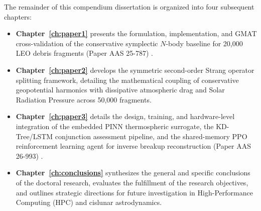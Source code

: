 The remainder of this compendium dissertation is organized into four subsequent chapters:
\begin{itemize}
    \item \textbf{Chapter~\ref{ch:paper1}} presents the formulation, implementation, and GMAT cross-validation of the conservative symplectic $N$-body baseline for 20,000 LEO debris fragments (Paper AAS 25-787) \cite{puerta-ibarra_aas25_2025}.
    \item \textbf{Chapter~\ref{ch:paper2}} develops the symmetric second-order Strang operator splitting framework, detailing the mathematical coupling of conservative geopotential harmonics with dissipative atmospheric drag and Solar Radiation Pressure across 50,000 fragments.
    \item \textbf{Chapter~\ref{ch:paper3}} details the design, training, and hardware-level integration of the embedded PINN thermospheric surrogate, the KD-Tree/LSTM conjunction assessment pipeline, and the shared-memory PPO reinforcement learning agent for inverse breakup reconstruction (Paper AAS 26-993) \cite{puerta-ibarra_aas26_2026}.
    \item \textbf{Chapter~\ref{ch:conclusions}} synthesizes the general and specific conclusions of the doctoral research, evaluates the fulfillment of the research objectives, and outlines strategic directions for future investigation in High-Performance Computing (HPC) and cislunar astrodynamics.
\end{itemize}
